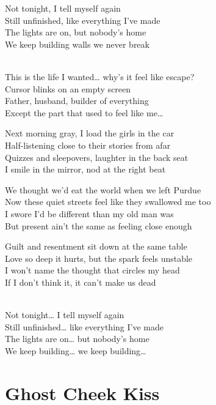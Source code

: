 \begin{lyrics}
Not tonight, I tell myself again\\
Still unfinished, like everything I’ve made\\
The lights are on, but nobody’s home\\
We keep building walls we never break

\\
This is the life I wanted… why’s it feel like escape?\\
Cursor blinks on an empty screen\\
Father, husband, builder of everything\\
Except the part that used to feel like me…

Next morning gray, I load the girls in the car\\
Half-listening close to their stories from afar\\
Quizzes and sleepovers, laughter in the back seat\\
I smile in the mirror, nod at the right beat

We thought we’d eat the world when we left Purdue\\
Now these quiet streets feel like they swallowed me too\\
I swore I’d be different than my old man was\\
But present ain’t the same as feeling close enough

Guilt and resentment sit down at the same table\\
Love so deep it hurts, but the spark feels unstable\\
I won’t name the thought that circles my head\\
If I don’t think it, it can’t make us dead

\\
Not tonight… I tell myself again\\
Still unfinished… like everything I’ve made\\
The lights are on… but nobody’s home\\
We keep building… we keep building…

\end{lyrics}

\section{Ghost Cheek Kiss}


